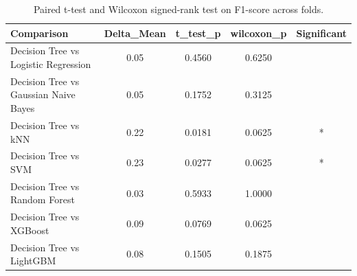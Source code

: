 \begin{table}[htbp]
\centering
\caption{Paired t-test and Wilcoxon signed-rank test on F1-score across folds.}
\label{tab:stat_tests_f1}
\begin{tabular}{lcccc}
\toprule
Comparison & Delta\_Mean & t\_test\_p & wilcoxon\_p & Significant \\
\midrule
Decision Tree vs Logistic Regression & 0.05 & 0.4560 & 0.6250 &  \\
Decision Tree vs Gaussian Naive Bayes & 0.05 & 0.1752 & 0.3125 &  \\
Decision Tree vs kNN & 0.22 & 0.0181 & 0.0625 & * \\
Decision Tree vs SVM & 0.23 & 0.0277 & 0.0625 & * \\
Decision Tree vs Random Forest & 0.03 & 0.5933 & 1.0000 &  \\
Decision Tree vs XGBoost & 0.09 & 0.0769 & 0.0625 &  \\
Decision Tree vs LightGBM & 0.08 & 0.1505 & 0.1875 &  \\
\bottomrule
\end{tabular}
\end{table}